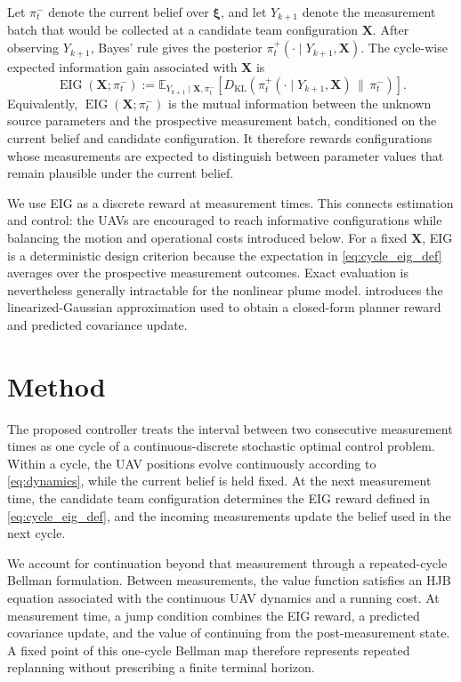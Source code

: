 \documentclass{article}
\newcommand{\E}{\mathbb{E}}
\newcommand{\bs}[1]{\boldsymbol{#1}}
\newcommand{\bX}{\mathbf{X}}
\newcommand{\KL}[2]{D_{\mathrm{KL}}\!\left(#1\,\|\,#2\right)}
\begin{document}
Let $\pi_t^-$ denote the current belief over $\bs\xi$, and let $Y_{k+1}$ denote the measurement batch that would be collected at a candidate team configuration $\bX$.
After observing $Y_{k+1}$, Bayes' rule gives the posterior $\pi_t^+(\cdot\mid Y_{k+1},\bX)$.
The cycle-wise expected information gain associated with $\bX$ is
\begin{equation}
\label{eq:cycle_eig_def}
\operatorname{EIG}(\bX;\pi_t^-)
:=
\E_{Y_{k+1}\mid \bX,\pi_t^-}
\!\left[
\KL{\pi_t^+(\cdot\mid Y_{k+1},\bX)}{\pi_t^-}
\right].
\end{equation}
Equivalently, $\operatorname{EIG}(\bX;\pi_t^-)$ is the mutual information between the unknown source parameters and the prospective measurement batch, conditioned on the current belief and candidate configuration.
It therefore rewards configurations whose measurements are expected to distinguish between parameter values that remain plausible under the current belief.

We use EIG as a discrete reward at measurement times.
This connects estimation and control: the UAVs are encouraged to reach informative configurations while balancing the motion and operational costs introduced below.
For a fixed $\bX$, EIG is a deterministic design criterion because the expectation in \eqref{eq:cycle_eig_def} averages over the prospective measurement outcomes.
Exact evaluation is nevertheless generally intractable for the nonlinear plume model.
 introduces the linearized-Gaussian approximation used to obtain a closed-form planner reward and predicted covariance update.

\section{Method}
\label{sec:method}

The proposed controller treats the interval between two consecutive measurement times as one cycle of a continuous-discrete stochastic optimal control problem.
Within a cycle, the UAV positions evolve continuously according to \eqref{eq:dynamics}, while the current belief is held fixed.
At the next measurement time, the candidate team configuration determines the EIG reward defined in \eqref{eq:cycle_eig_def}, and the incoming measurements update the belief used in the next cycle.

We account for continuation beyond that measurement through a repeated-cycle Bellman formulation.
Between measurements, the value function satisfies an HJB equation associated with the continuous UAV dynamics and a running cost.
At measurement time, a jump condition combines the EIG reward, a predicted covariance update, and the value of continuing from the post-measurement state.
A fixed point of this one-cycle Bellman map therefore represents repeated replanning without prescribing a finite terminal horizon.
\end{document}
